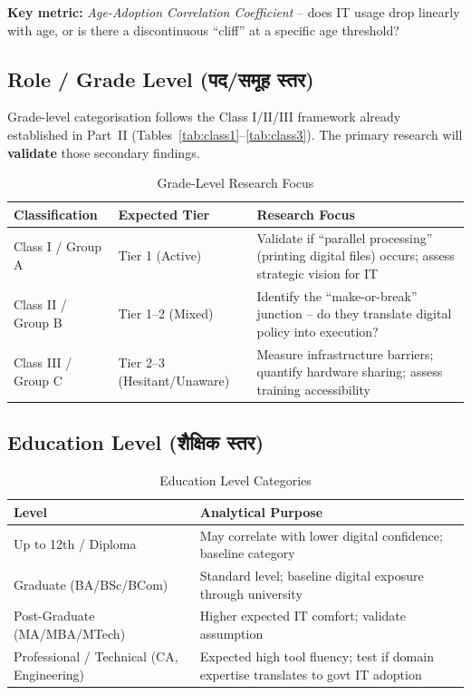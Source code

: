 \documentclass[12pt,a4paper]{article}
\newcommand{\hindi}[1]{{\hindifont #1}}
\begin{document}
\textbf{Key metric:} \textit{Age-Adoption Correlation Coefficient} -- does IT usage drop linearly with age, or is there a discontinuous ``cliff'' at a specific age threshold?

\subsection{Role / Grade Level (\hindi{पद/समूह स्तर})}

Grade-level categorisation follows the Class I/II/III framework already established in Part~II (Tables~\ref{tab:class1}--\ref{tab:class3}). The primary research will \textbf{validate} those secondary findings.

\begin{table}[H]
\centering
\caption{Grade-Level Research Focus}
\label{tab:demo_grade}
\begin{tabularx}{\textwidth}{@{}llX@{}}
\toprule
\textbf{Classification} & \textbf{Expected Tier} & \textbf{Research Focus} \\
\midrule
Class I / Group A & Tier 1 (Active) & Validate if ``parallel processing'' (printing digital files) occurs; assess strategic vision for IT \\
Class II / Group B & Tier 1--2 (Mixed) & Identify the ``make-or-break'' junction -- do they translate digital policy into execution? \\
Class III / Group C & Tier 2--3 (Hesitant/Unaware) & Measure infrastructure barriers; quantify hardware sharing; assess training accessibility \\
\bottomrule
\end{tabularx}
\end{table}

\subsection{Education Level (\hindi{शैक्षिक स्तर})}

\begin{table}[H]
\centering
\caption{Education Level Categories}
\label{tab:demo_education}
\begin{tabularx}{\textwidth}{@{}lX@{}}
\toprule
\textbf{Level} & \textbf{Analytical Purpose} \\
\midrule
Up to 12th / Diploma & May correlate with lower digital confidence; baseline category \\
Graduate (BA/BSc/BCom) & Standard level; baseline digital exposure through university \\
Post-Graduate (MA/MBA/MTech) & Higher expected IT comfort; validate assumption \\
Professional / Technical (CA, Engineering) & Expected high tool fluency; test if domain expertise translates to govt IT adoption \\
\bottomrule
\end{tabularx}
\end{table}
\end{document}

